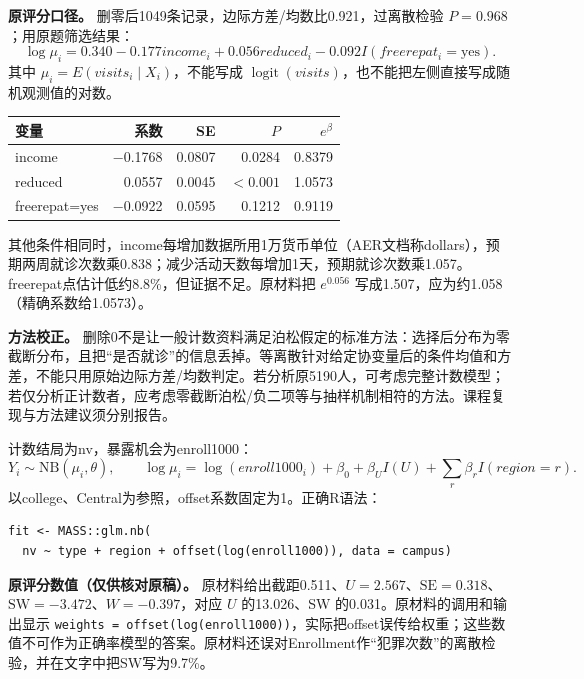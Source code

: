 
\textbf{原评分口径。} 删零后1049条记录，边际方差/均数比0.921，过离散检验 \(P=0.968\)；用原题筛选结果： \[\log\mu_i=0.340-0.177income_i+0.056reduced_i-0.092I(freerepat_i=\mathrm{yes}).\] 其中 \(\mu_i=E(visits_i\mid X_i)\)，不能写成 \(\operatorname{logit}(visits)\)，也不能把左侧直接写成随机观测值的对数。

\begin{longtable}[]{@{}lrrrr@{}}
\toprule\noalign{}
变量 & 系数 & SE & \(P\) & \(e^\beta\) \\
\midrule\noalign{}
\endhead
\bottomrule\noalign{}
\endlastfoot
income & −0.1768 & 0.0807 & 0.0284 & 0.8379 \\
reduced & 0.0557 & 0.0045 & \(<0.001\) & 1.0573 \\
freerepat=yes & −0.0922 & 0.0595 & 0.1212 & 0.9119 \\
\end{longtable}

其他条件相同时，income每增加数据所用1万货币单位（AER文档称dollars），预期两周就诊次数乘0.838；减少活动天数每增加1天，预期就诊次数乘1.057。freerepat点估计低约8.8\%，但证据不足。原材料把 \(e^{0.056}\) 写成1.507，应为约1.058（精确系数给1.0573）。

\textbf{方法校正。} 删除0不是让一般计数资料满足泊松假定的标准方法：选择后分布为零截断分布，且把``是否就诊''的信息丢掉。等离散针对给定协变量后的条件均值和方差，不能只用原始边际方差/均数判定。若分析原5190人，可考虑完整计数模型；若仅分析正计数者，应考虑零截断泊松/负二项等与抽样机制相符的方法。课程复现与方法建议须分别报告。



计数结局为nv，暴露机会为enroll1000： \[Y_i\sim\mathrm{NB}(\mu_i,\theta),\qquad\log\mu_i=\log(enroll1000_i)+\beta_0+\beta_U I(U)+\sum_r\beta_rI(region=r).\] 以college、Central为参照，offset系数固定为1。正确R语法：

\begin{verbatim}
fit <- MASS::glm.nb(
  nv ~ type + region + offset(log(enroll1000)), data = campus)
\end{verbatim}

\textbf{原评分数值（仅供核对原稿）。} 原材料给出截距0.511、\(U=2.567\)、\(\mathrm{SE}=0.318\)、\(\mathrm{SW}=-3.472\)、\(W=-0.397\)，对应 \(U\) 的13.026、SW 的0.031。原材料的调用和输出显示 \texttt{weights\ =\ offset(log(enroll1000))}，实际把offset误传给权重；这些数值不可作为正确率模型的答案。原材料还误对Enrollment作``犯罪次数''的离散检验，并在文字中把SW写为9.7\%。

